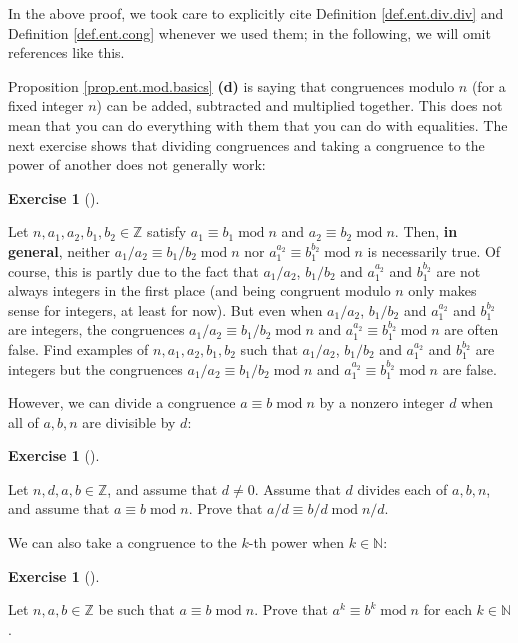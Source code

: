 \documentclass[numbers=enddot,12pt,final,onecolumn,notitlepage]{scrartcl}%
\newcounter{exer}
\numberwithin{exer}{subsection}
\theoremstyle{definition}
\newtheorem{exmp}[exer]{Exercise}
\newenvironment{exercise}[1][]
{\begin{exmp}[#1]\begin{leftbar}}
{\end{leftbar}\end{exmp}}
\begin{document}
In the above proof, we took care to explicitly cite Definition
\ref{def.ent.div.div} and Definition \ref{def.ent.cong} whenever we used them;
in the following, we will omit references like this.

Proposition \ref{prop.ent.mod.basics} \textbf{(d)} is saying that congruences
modulo $n$ (for a fixed integer $n$) can be added, subtracted and multiplied
together. This does not mean that you can do everything with them that you can
do with equalities. The next exercise shows that dividing congruences and
taking a congruence to the power of another does not generally work:

\begin{exercise}
\label{exe.ent.mod.basics-nope}Let $n,a_{1},a_{2},b_{1},b_{2}\in\mathbb{Z}$
satisfy $a_{1}\equiv b_{1}\operatorname{mod}n$ and $a_{2}\equiv b_{2}%
\operatorname{mod}n$. Then, \textbf{in general}, neither $a_{1}/a_{2}\equiv
b_{1}/b_{2}\operatorname{mod}n$ nor $a_{1}^{a_{2}}\equiv b_{1}^{b_{2}%
}\operatorname{mod}n$ is necessarily true. Of course, this is partly due to
the fact that $a_{1}/a_{2}$, $b_{1}/b_{2}$ and $a_{1}^{a_{2}}$ and
$b_{1}^{b_{2}}$ are not always integers in the first place (and being
congruent modulo $n$ only makes sense for integers, at least for now). But
even when $a_{1}/a_{2}$, $b_{1}/b_{2}$ and $a_{1}^{a_{2}}$ and $b_{1}^{b_{2}}$
are integers, the congruences $a_{1}/a_{2}\equiv b_{1}/b_{2}\operatorname{mod}%
n$ and $a_{1}^{a_{2}}\equiv b_{1}^{b_{2}}\operatorname{mod}n$ are often false.
Find examples of $n,a_{1},a_{2},b_{1},b_{2}$ such that $a_{1}/a_{2}$,
$b_{1}/b_{2}$ and $a_{1}^{a_{2}}$ and $b_{1}^{b_{2}}$ are integers but the
congruences $a_{1}/a_{2}\equiv b_{1}/b_{2}\operatorname{mod}n$ and
$a_{1}^{a_{2}}\equiv b_{1}^{b_{2}}\operatorname{mod}n$ are false.
\end{exercise}

However, we can divide a congruence $a\equiv b\operatorname{mod}n$ by a
nonzero integer $d$ when all of $a,b,n$ are divisible by $d$:

\begin{exercise}
\label{exe.ent.mod.basics.2}Let $n,d,a,b\in\mathbb{Z}$, and assume that
$d\neq0$. Assume that $d$ divides each of $a,b,n$, and assume that $a\equiv
b\operatorname{mod}n$. Prove that $a/d\equiv b/d\operatorname{mod}n/d$.
\end{exercise}

We can also take a congruence to the $k$-th power when $k\in\mathbb{N}$:

\begin{exercise}
\label{exe.ent.mod.basics.k-power}Let $n,a,b\in\mathbb{Z}$ be such that
$a\equiv b\operatorname{mod}n$. Prove that $a^{k}\equiv b^{k}%
\operatorname{mod}n$ for each $k\in\mathbb{N}$.
\end{exercise}
\end{document}
